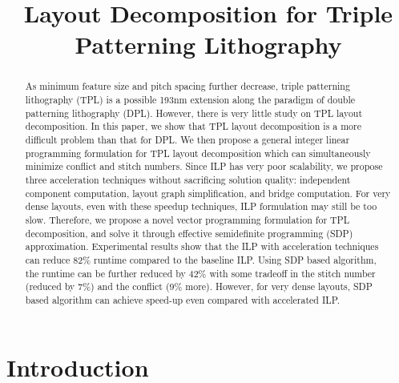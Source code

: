 \documentclass[10pt,conference]{IEEEtran}
\begin{document}
\title{\huge Layout Decomposition for Triple Patterning Lithography}

\author{
}

\maketitle

\newtheorem{problem}{\textbf{Problem}}
\newtheorem{define}{\textbf{Definition}}
\newtheorem{theorem}{\textbf{Theorem}}
\newtheorem{lemma}{\textbf{Lemma}}
\newtheorem{conjecture}{Conjecture}

\begin{abstract}
As minimum feature size and pitch spacing further decrease, triple patterning lithography (TPL) is a possible 193nm extension along the paradigm of double patterning lithography (DPL). However, there is very little study on TPL layout decomposition.  In this paper, we show that TPL layout decomposition is a more difficult problem than that for DPL. We then propose a general integer linear programming formulation for TPL layout decomposition which can simultaneously minimize conflict and stitch numbers.
Since ILP has very poor scalability,  we propose three acceleration techniques without sacrificing solution quality:
independent component computation, layout graph simplification, and bridge computation. 
For very dense layouts, even with these speedup techniques, ILP formulation may still be too slow. Therefore, we propose a novel vector programming formulation for TPL decomposition, and solve it through effective semidefinite programming (SDP) approximation.
Experimental results show that the ILP with acceleration techniques can reduce 82\% runtime compared to the baseline ILP.
Using SDP based algorithm, the runtime can be further reduced by 42\% with some tradeoff in the stitch number (reduced by 7\%) and the conflict (9\% more).  However, for very dense layouts, SDP based algorithm can achieve  speed-up even compared with accelerated ILP.
\end{abstract}

\section{Introduction}
\end{document}
